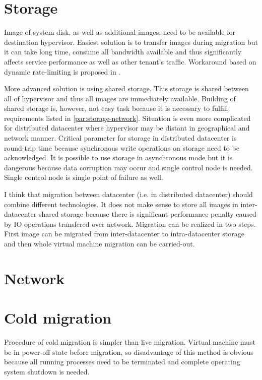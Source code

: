\section{Storage}
Image of system disk, as well as additional images, need to be available for destination hypervisor. Easiest solution is to transfer images during migration but it can take long time, consume all bandwidth available and thus significantly affects service performance as well as other tenant's traffic. Workaround based on dynamic rate-limiting is proposed in \cite{live-migration-of-vms}.

More advanced solution is using shared storage. This storage is shared between all of hypervisor and thus all images are immediately available. Building of shared storage is, however, not easy task because it is necessary to fulfill requirements listed in \ref{par:storage-network}. Situation is even more complicated for distributed datacenter where hypervisor may be distant in geographical and network manner. Critical parameter for storage in distributed datacenter is round-trip time because synchronous write operations on storage need to be acknowledged. It is possible to use storage in asynchronous mode but it is dangerous because data corruption may occur and single control node is needed. Single control node is single point of failure as well. 

I think that migration between datacenter (i.e. in distributed datacenter) should combine different technologies. It does not make sense to store all images in inter-datacenter shared storage because there is significant performance penalty caused by \Ac{IO} operations transfered over network. Migration can be realized in two steps. First image can be migrated from inter-datacenter to intra-datacenter storage and then whole virtual machine migration can be carried-out.


\section{Network}


\section{Cold migration}
Procedure of cold migration is simpler than live migration. Virtual machine must be in power-off state before migration, so disadvantage of this method is obvious because all running processes need to be terminated and complete operating system shutdown is needed.

